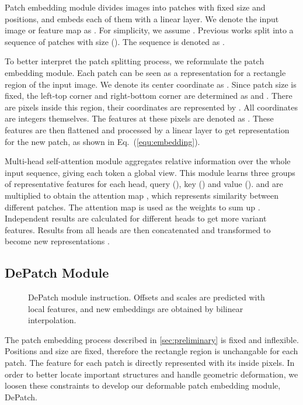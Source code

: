 \documentclass[sigconf,screen]{acmart}
\begin{document}
Patch embedding module divides images into patches with fixed size and positions, and embeds each of them with a linear layer. We denote the input image or feature map as . For simplicity, we assume . Previous works split  into a sequence of  patches with size  (). The sequence is denoted as . 

To better interpret the patch splitting process, we reformulate the patch embedding module. Each patch  can be seen as a representation for a rectangle region of the input image. We denote its center coordinate as . Since patch size is fixed, the left-top corner and right-bottom corner are determined as  and . There are  pixels inside this region, their coordinates are represented by . All coordinates  are integers themselves. The features at these pixels are denoted as . These features are then flattened and processed by a linear layer to get representation for the new patch, as shown in Eq.~(\ref{equ:embedding}).


Multi-head self-attention module aggregates relative information over the whole input sequence, giving each token a global view. This module learns three groups of representative features for each head, query (), key () and value ().  and  are multiplied to obtain the attention map , which represents similarity between different patches. The attention map is used as the weights to sum up . Independent results are calculated for different heads to get more variant features. Results from all heads are then concatenated and transformed to become new representations .



\subsection{DePatch Module \label{sec:module}}

\begin{figure}[h]
  \centering
  \centering
  \caption{DePatch module instruction. Offsets and scales are predicted with local features, and new embeddings are obtained by bilinear interpolation.}
  \label{fig:DePatch}
\end{figure}

The patch embedding process described in \ref{sec:preliminary} is fixed and inflexible. Positions  and size  are fixed, therefore the rectangle region is unchangable for each patch. The feature for each patch is directly represented with its inside pixels. In order to better locate important structures and handle geometric deformation, we loosen these constraints to develop our deformable patch embedding module, DePatch.
\end{document}
